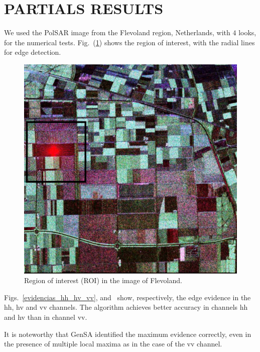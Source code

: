 \documentclass[a4paper,12pt]{article}
\begin{document}
\section{PARTIALS RESULTS} \label{sec:part_result}

We used the PolSAR image from the Flevoland region, Netherlands, with $4$ looks, for the numerical tests. 
Fig.~(\ref{flevoland_radial_4look}) shows the region of interest, with the radial lines for edge detection.

\begin{figure}[hbt]
\centering
	\includegraphics[width=\linewidth]{flevoland_radial_4_look_black}
	\caption{Region of interest (ROI) in the image of Flevoland.}
\label{flevoland_radial_4look}
\end{figure}

Figs.~\ref{evidencias_hh_hv_vv},  and~ show, respectively, the edge evidence in the hh, hv and vv channels. 
The algorithm achieves better accuracy in channels hh and hv than in channel vv.  

It is noteworthy that GenSA identified the maximum evidence correctly, even in the presence of multiple local maxima as in the case of the vv channel.
\end{document}
